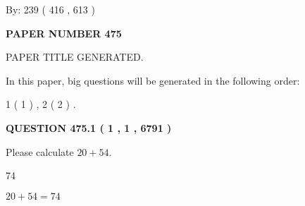 \documentclass[12pt]{article}
\begin{document}
   
\hspace{1.0in} By: 
 239 ( 416 ,  613 )
   
   
   
   
\newpage 
\setcounter{page}{ 
   475001 } 
   
   
   
   
 {\textbf{ \Large{ PAPER NUMBER  475  }}}
   
   
\vspace{0.2in}
   
   
   
   
   
   
   
   
 \vspace{0.2in}
 
 
 
 
   
   
 PAPER TITLE GENERATED.
   
   
   
\vspace{0.2in}
   
In this paper, big questions will be generated in the following order: 
   
   
   1 ( 1 )
 ,
   2 ( 2 )
 .
  
\vspace{0.2in}
  
{\textbf{\Large{QUESTION
475.1 
 ( 1 , 1 , 6791 )
}}}
  
  
 
Please calculate $ %
20 +  %
54 $.
 
 
 
\noindent{}
 
 

74
 
 
\noindent{}
 
 

 
 
 
\noindent{}
 
 

$ %
20 +  %
54=   %
74$
 
 
\noindent{}
 
\end{document}
